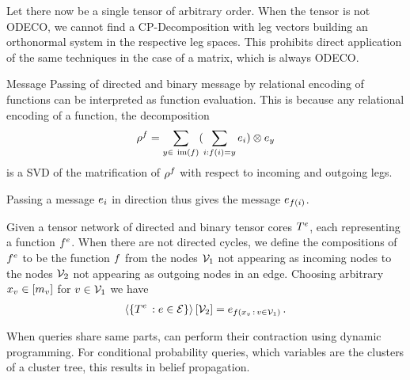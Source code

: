 
Let there now be a single tensor of arbitrary order.
When the tensor is not ODECO, we cannot find a CP-Decomposition with leg vectors building an orthonormal system in the respective leg spaces.
This prohibits direct application of the same techniques in the case of a matrix, which is always ODECO.




Message Passing of directed and binary message by relational encoding of functions can be interpreted as function evaluation.
This is because any relational encoding of a function, the decomposition
\begin{align*}
	\rencodingof{\exfunction} = \sum_{y \in \imageof{\exfunction}} ( \sum_{i: \exfunction(i)=y}\onehotmapof{i} )  \otimes \onehotmapof{y}
\end{align*}
is a SVD of the matrification of $\rho^{f}$ with respect to incoming and outgoing legs.


Passing a message $e_{i}$ in direction thus gives the message $e_{f(i)}$.



\begin{remark}
	Given a tensor network of directed and binary tensor cores $T^{e}$, each representing a function $f^{e}$.
	When there are not directed cycles, we define the compositions of $f^{e}$ to be the function $f$ from the nodes $\mathcal{V}_1$ not appearing as incoming nodes to the nodes $\mathcal{V}_2$ not appearing as outgoing nodes in an edge.
	Choosing arbitrary $x_{v}\in[m_{v}]$ for $v\in\mathcal{V}_1$ we have
	\begin{align*}
		\left\langle \{T^{e} \, : e\in\mathcal{E}\}\right\rangle \left[ \mathcal{V}_2 \right] = e_{f(x_{v} \, : \, v\in\mathcal{V}_1)}\, . 
	\end{align*}
\end{remark}





When queries share same parts, can perform their contraction using dynamic programming.
For conditional probability queries, which variables are the clusters of a cluster tree, this results in belief propagation.


